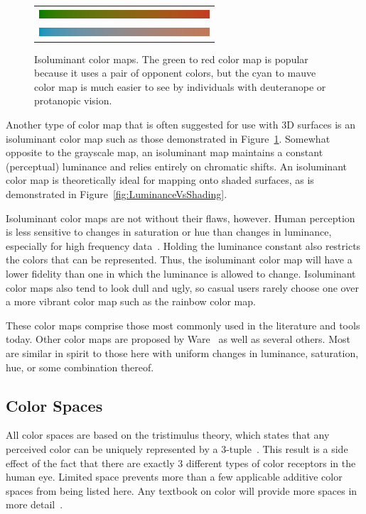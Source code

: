 \documentclass[review,journal]{vgtc}         %
\newcommand{\lcite}[1]{~\cite{#1}}
\newcommand{\scite}[1]{~\cite{#1}}
\begin{document}
\begin{figure}
  \centering
  \begin{tabular}{c}
    \includegraphics[width=2.5in]{images/Green2RedBar} \\
    \includegraphics[width=2.5in]{images/Cyan2MauveBar}
  \end{tabular}
  \caption{Isoluminant color maps.  The green to red color map is popular
    because it uses a pair of opponent colors, but the cyan to mauve color
    map is much easier to see by individuals with deuteranope or protanopic
    vision.}
  \label{fig:IsoluminantColorMap}
\end{figure}
Another type of color map that is often suggested for use with 3D surfaces
is an isoluminant color map such as those demonstrated in
Figure~\ref{fig:IsoluminantColorMap}.  Somewhat opposite to the grayscale
map, an isoluminant map maintains a constant (perceptual) luminance and
relies entirely on chromatic shifts.  An isoluminant color map is
theoretically ideal for mapping onto shaded surfaces, as is demonstrated in
Figure~\ref{fig:LuminanceVsShading}.

Isoluminant color maps are not without their flaws, however.  Human
perception is less sensitive to changes in saturation or hue than changes
in luminance, especially for high frequency data\lcite{Rogowitz96}.
Holding the luminance constant also restricts the colors that can be
represented.  Thus, the isoluminant color map will have a lower fidelity
than one in which the luminance is allowed to change.  Isoluminant color
maps also tend to look dull and ugly, so casual users rarely
choose one over a more vibrant color map such as the rainbow color map.

These color maps comprise those most commonly used in the literature and tools
today.  Other color maps are proposed by Ware\scite{Ware04} as well as
several others.  Most are similar in spirit to those here with uniform
changes in luminance, saturation, hue, or some combination thereof.

\subsection{Color Spaces}
\label{sec:PreviousWork:ColorSpaces}

All color spaces are based on the tristimulus theory, which states that any
perceived color can be uniquely represented by a
3-tuple\lcite{Stone03}.  This result is a side effect
of the fact that there are exactly 3 different types of color receptors in
the human eye.  Limited space prevents more than a few applicable additive
color spaces from being listed here.  Any textbook on color will provide
more spaces in more detail\lcite{Stone03,Wyszecki82}.
\end{document}
